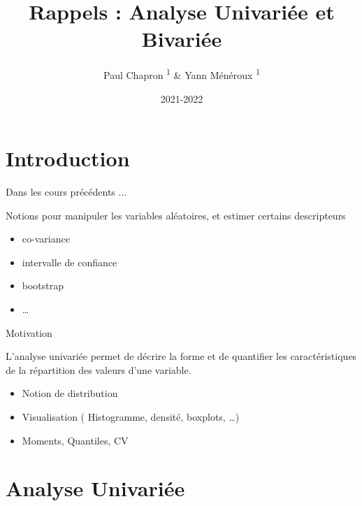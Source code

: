 \documentclass{beamer}
\title{Rappels : Analyse Univariée et Bivariée}
\subtitle{}
\date{2021-2022}
\author{Paul Chapron \textsuperscript{1} \& Yann Ménéroux \textsuperscript{1}}
\institute{ \textsuperscript{1}IGN-ENSG-UGE}
\begin{document}
\maketitle	

\section{Introduction} 

\begin{frame}{Dans les cours précédents ... }


Notions pour manipuler les \alert{variables aléatoires}, et estimer certains descripteurs

\begin{itemize}
\item co-variance
\item intervalle de confiance 
\item bootstrap
\item \dots
\end{itemize}

\end{frame}


\begin{frame}{Motivation}


L'analyse \alert{univariée} permet de \alert{décrire la forme}  et de \alert{quantifier} les caractéristiques de  la \alert{répartition des valeurs} d'une variable.



\begin{itemize}
	\item Notion de distribution 
	\item Visualisation ( Histogramme, densité, boxplots, \dots)
	\item Moments, Quantiles, CV 
\end{itemize}
\end{frame}






\section{Analyse Univariée}
\end{document}
